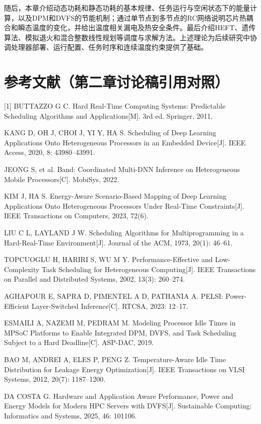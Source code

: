 随后，本章介绍动态功耗和静态功耗的基本规律、任务运行与空闲状态下的能量计算，以及DPM和DVFS的节能机制；通过单节点到多节点的RC网络说明芯片热耦合和瞬态温度的变化，并给出温度相关漏电及热安全条件。最后介绍HEFT、遗传算法、模拟退火和混合整数线性规划等调度与求解方法。上述理论为后续研究中协调处理器部署、运行配置、任务时序和连续温度约束提供了基础。

\section*{参考文献（第二章讨论稿引用对照）}
\begingroup\small\setlength{\parindent}{0pt}\setlength{\parskip}{4pt}
[1] BUTTAZZO G C. Hard Real-Time Computing Systems: Predictable Scheduling Algorithms and Applications[M]. 3rd ed. Springer, 2011.\par
[2] KANG D, OH J, CHOI J, YI Y, HA S. Scheduling of Deep Learning Applications Onto Heterogeneous Processors in an Embedded Device[J]. IEEE Access, 2020, 8: 43980--43991.\par
[3] JEONG S, et al. Band: Coordinated Multi-DNN Inference on Heterogeneous Mobile Processors[C]. MobiSys, 2022.\par
[4] KIM J, HA S. Energy-Aware Scenario-Based Mapping of Deep Learning Applications Onto Heterogeneous Processors Under Real-Time Constraints[J]. IEEE Transactions on Computers, 2023, 72(6).\par
[5] LIU C L, LAYLAND J W. Scheduling Algorithms for Multiprogramming in a Hard-Real-Time Environment[J]. Journal of the ACM, 1973, 20(1): 46--61.\par
[6] TOPCUOGLU H, HARIRI S, WU M Y. Performance-Effective and Low-Complexity Task Scheduling for Heterogeneous Computing[J]. IEEE Transactions on Parallel and Distributed Systems, 2002, 13(3): 260--274.\par
[7] AGHAPOUR E, SAPRA D, PIMENTEL A D, PATHANIA A. PELSI: Power-Efficient Layer-Switched Inference[C]. RTCSA, 2023: 12--17.\par
[8] ESMAILI A, NAZEMI M, PEDRAM M. Modeling Processor Idle Times in MPSoC Platforms to Enable Integrated DPM, DVFS, and Task Scheduling Subject to a Hard Deadline[C]. ASP-DAC, 2019.\par
[9] BAO M, ANDREI A, ELES P, PENG Z. Temperature-Aware Idle Time Distribution for Leakage Energy Optimization[J]. IEEE Transactions on VLSI Systems, 2012, 20(7): 1187--1200.\par
[10] DA COSTA G. Hardware and Application Aware Performance, Power and Energy Models for Modern HPC Servers with DVFS[J]. Sustainable Computing: Informatics and Systems, 2025, 46: 101106.\par
